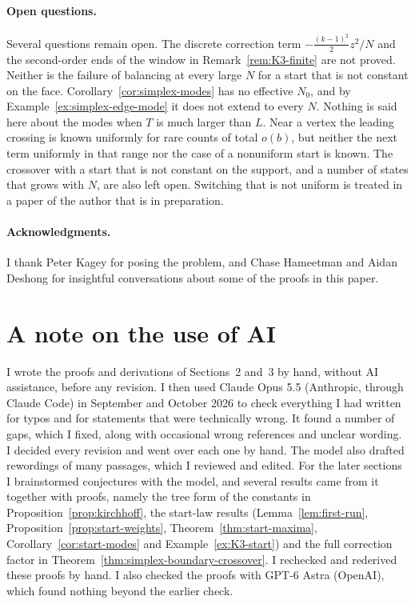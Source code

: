 \documentclass[11pt]{article}
\theoremstyle{definition}
\theoremstyle{remark}
\begin{document}
\paragraph{Open questions.}
Several questions remain open. The discrete correction term
$-\frac{(k-1)^2}2z^2/N$ and the second-order ends of the window in
Remark~\ref{rem:K3-finite} are not proved. Neither is the failure of balancing
at every large $N$ for a start that is not constant on the face.
Corollary~\ref{cor:simplex-modes} has no effective $N_0$, and by
Example~\ref{ex:simplex-edge-mode} it does not extend to every $N$. Nothing is
said here about the modes when $T$ is much larger than $L$. Near a vertex the
leading crossing is known uniformly for rare counts of total $o(b)$, but neither
the next term uniformly in that range nor the case of a nonuniform start is
known. The crossover with a start that is not constant on the support, and a
number of states that grows with $N$, are also left open. Switching that is not
uniform is treated in a paper of the author that is in preparation.

\paragraph{Acknowledgments.} I thank Peter Kagey for posing the problem, and
Chase Hameetman and Aidan Deshong for insightful conversations about some of
the proofs in this paper.

\section*{A note on the use of AI}
I wrote the proofs and derivations of Sections~2 and~3 by hand, without AI
assistance, before any revision. I then used Claude Opus 5.5 (Anthropic,
through Claude Code) in September and October 2026 to check everything I had
written for typos and for statements that were technically wrong. It found a
number of gaps, which I fixed, along with occasional wrong references and
unclear wording. I decided every revision and went over each one by hand. The model also
drafted rewordings of many passages, which I reviewed and edited. For the later sections I brainstormed
conjectures with the model, and several results came from it together with
proofs, namely the tree form of the constants in Proposition~\ref{prop:kirchhoff},
the start-law results (Lemma~\ref{lem:first-run},
Proposition~\ref{prop:start-weights}, Theorem~\ref{thm:start-maxima},
Corollary~\ref{cor:start-modes} and Example~\ref{ex:K3-start}) and the full
correction factor in Theorem~\ref{thm:simplex-boundary-crossover}. I rechecked
and rederived these proofs by hand. I also checked the proofs with GPT-6 Astra
(OpenAI), which found nothing beyond the earlier check.
\end{document}
